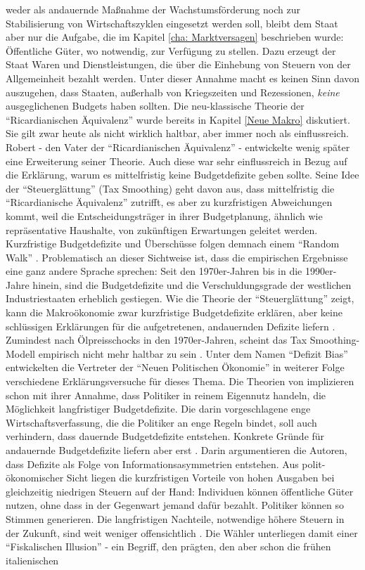 weder als andauernde Maßnahme der Wachstumsförderung noch zur Stabilisierung von Wirtschaftszyklen eingesetzt werden soll, bleibt dem Staat aber nur die Aufgabe, die im Kapitel \ref{cha: Marktversagen} beschrieben wurde: Öffentliche Güter, wo notwendig, zur Verfügung zu stellen. Dazu erzeugt der Staat Waren und Dienstleistungen, die über die Einhebung von Steuern von der Allgemeinheit bezahlt werden. Unter dieser Annahme macht es keinen Sinn davon auszugehen, dass Staaten, außerhalb von Kriegszeiten und Rezessionen, \textit{keine} ausgeglichenen Budgets haben sollten. Die neu-klassische Theorie der "`Ricardianischen Äquivalenz"' wurde bereits in Kapitel \ref{Neue Makro} diskutiert. Sie gilt zwar heute als nicht wirklich haltbar, aber immer noch als einflussreich. Robert \textcite{Barro1979} - den Vater der "`Ricardianischen Äquivalenz"' - entwickelte wenig später eine Erweiterung seiner Theorie. Auch diese war sehr einflussreich in Bezug auf die Erklärung, warum es mittelfristig keine Budgetdefizite geben sollte. Seine Idee der "`Steuerglättung"' (Tax Smoothing) geht davon aus, dass mittelfristig die "`Ricardianische Äquivalenz"' zutrifft, es aber zu kurzfristigen Abweichungen kommt, weil die Entscheidungsträger in ihrer Budgetplanung, ähnlich wie repräsentative Haushalte, von zukünftigen Erwartungen geleitet werden. Kurzfristige Budgetdefizite und Überschüsse folgen demnach einem "`Random Walk"' \parencite[S. 676]{Romer2019}. Problematisch an dieser Sichtweise ist, dass die empirischen Ergebnisse eine ganz andere Sprache sprechen: Seit den 1970er-Jahren bis in die 1990er-Jahre hinein, sind die Budgetdefizite und die Verschuldungsgrade der westlichen Industriestaaten erheblich gestiegen.  Wie die Theorie der "`Steuerglättung"' zeigt, kann die Makroökonomie zwar kurzfristige Budgetdefizite erklären, aber keine schlüssigen Erklärungen für die aufgetretenen, andauernden Defizite liefern \parencite{Roubini1989}. Zumindest nach Ölpreisschocks in den 1970er-Jahren, scheint das Tax Smoothing-Modell empirisch nicht mehr haltbar zu sein \parencite{Roubini1989}.  Unter dem Namen "`Defizit Bias"' entwickelten die Vertreter der "`Neuen Politischen Ökonomie"' in weiterer Folge verschiedene Erklärungsversuche für dieses Thema. Die Theorien von \textcite{Buchanan1962} implizieren schon mit ihrer Annahme, dass Politiker in reinem Eigennutz handeln, die Möglichkeit langfristiger Budgetdefizite. Die darin vorgeschlagene enge Wirtschaftsverfassung, die die Politiker an enge Regeln bindet, soll auch verhindern, dass dauernde Budgetdefizite entstehen. Konkrete Gründe für andauernde Budgetdefizite liefern aber erst \textcite{Buchanan1977}. Darin argumentieren die Autoren, dass Defizite als Folge von Informationsasymmetrien entstehen. Aus polit-ökonomischer Sicht liegen die kurzfristigen Vorteile von hohen Ausgaben bei gleichzeitig niedrigen Steuern auf der Hand: Individuen können öffentliche Güter nutzen, ohne dass in der Gegenwart jemand dafür bezahlt. Politiker können so Stimmen generieren. Die langfristigen Nachteile, notwendige höhere Steuern in der Zukunft, sind weit weniger offensichtlich \parencite[S. 679]{Romer2019}. Die Wähler unterliegen damit einer "`Fiskalischen Illusion"' - ein Begriff, den \textcite[S. 134]{Buchanan1977} prägten, den aber schon die frühen italienischen 
